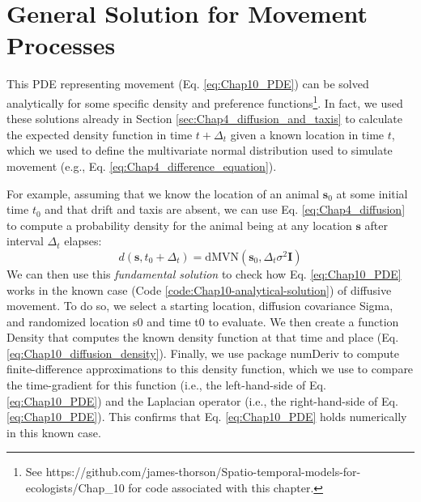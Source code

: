 \section{General Solution for Movement Processes} \label{sec:Chap10_solving_movement_process}

This PDE representing movement (Eq. \ref{eq:Chap10_PDE}) can be solved analytically for some specific density and preference functions\footnote{See https://github.com/james-thorson/Spatio-temporal-models-for-ecologists/Chap\_10 for code associated with this chapter.}.  In fact, we used these solutions already in Section \ref{sec:Chap4_diffusion_and_taxis} to calculate the expected density function in time \(t+\Delta_t\) given a known location in time \(t\), which we used to define the multivariate normal distribution used to simulate movement (e.g., Eq. \ref{eq:Chap4_difference_equation}).  

For example, assuming that we know the location of an animal \(\mathbf{s}_0\) at some initial time \(t_0\) and that drift and taxis are absent, we can use Eq. \ref{eq:Chap4_diffusion} to compute a probability density for the animal being at any location \(\mathbf{s}\) after interval \(\Delta_t\) elapses:
\begin{equation} \label{eq:Chap10_diffusion_density}
    d(\mathbf{s},t_0+\Delta_t) = \mathrm{dMVN}( \mathbf{s}_0, \Delta_t \sigma^2 \mathbf{I} )
\end{equation}
We can then use this \textit{fundamental solution} to check how Eq. \ref{eq:Chap10_PDE} works in the known case (Code \ref{code:Chap10-analytical-solution}) of diffusive movement. To do so, we select a starting location, diffusion covariance \colorbox{backcolour}{Sigma}, and randomized location \colorbox{backcolour}{s0}  and time \colorbox{backcolour}{t0} to evaluate.  We then create a function \colorbox{backcolour}{Density} that computes the known density function at that time and place (Eq. \ref{eq:Chap10_diffusion_density}). Finally, we use package \colorbox{backcolour}{numDeriv} \cite{gilbert_numderiv_2019} to compute finite-difference approximations to this density function, which we use to compare the time-gradient for this function (i.e., the left-hand-side of Eq. \ref{eq:Chap10_PDE}) and the Laplacian operator (i.e., the right-hand-side of Eq. \ref{eq:Chap10_PDE}).  This confirms that Eq. \ref{eq:Chap10_PDE} holds numerically in this known case.  

\lstset{style=Rcode}
 

